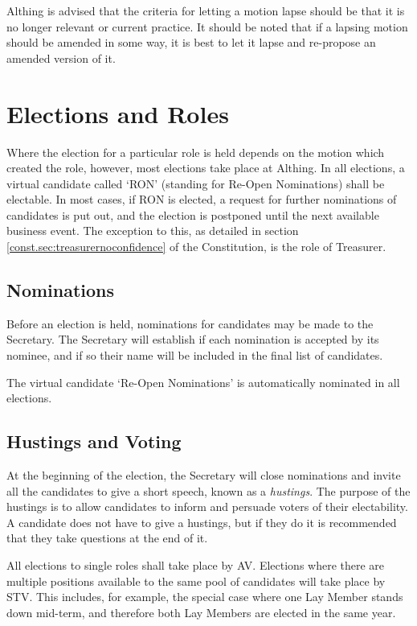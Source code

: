 \documentclass[a4paper, 11pt]{article} %
\begin{document}
Althing is advised that the criteria for letting a motion lapse should be that it is no longer relevant or current practice.  It should be noted that if a lapsing motion should be amended in some way, it is best to let it lapse and re-propose an amended version of it.

\section{Elections and Roles}
Where the election for a particular role is held depends on the motion which created the role, however, most elections take place at Althing.  In all elections, a virtual candidate called `RON' (standing for Re-Open Nominations) shall be electable.  In most cases, if RON is elected, a request for further nominations of candidates is put out, and the election is postponed until the next available business event.  The exception to this, as detailed in section \ref{const.sec:treasurernoconfidence} of the Constitution, is the role of Treasurer.

\subsection{Nominations}
Before an election is held, nominations for candidates may be made to the Secretary.  The Secretary will establish if each nomination is accepted by its nominee, and if so their name will be included in the final list of candidates.

The virtual candidate `Re-Open Nominations' is automatically nominated in all elections.

\subsection{Hustings and Voting}
At the beginning of the election, the Secretary will close nominations and invite all the candidates to give a short speech, known as a \emph{hustings}.  The purpose of the hustings is to allow candidates to inform and persuade voters of their electability.  A candidate does not have to give a hustings, but if they do it is recommended that they take questions at the end of it.

All elections to single roles shall take place by AV.  Elections where there are multiple positions available to the same pool of candidates will take place by STV.  This includes, for example, the special case where one Lay Member stands down mid-term, and therefore both Lay Members are elected in the same year.
\end{document}
